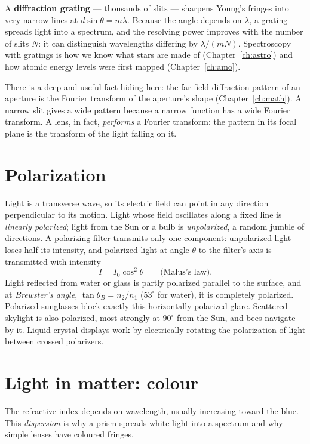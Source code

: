 A \textbf{diffraction grating} --- thousands of slits --- sharpens Young's fringes into very narrow lines at $d\sin\theta = m\lambda$. Because the angle depends on $\lambda$, a grating spreads light into a spectrum, and the resolving power improves with the number of slits $N$: it can distinguish wavelengths differing by $\lambda/(mN)$. Spectroscopy with gratings is how we know what stars are made of (Chapter~\ref{ch:astro}) and how atomic energy levels were first mapped (Chapter~\ref{ch:amo}).

\begin{remark}
There is a deep and useful fact hiding here: the far-field diffraction pattern of an aperture is the Fourier transform of the aperture's shape (Chapter~\ref{ch:math}). A narrow slit gives a wide pattern because a narrow function has a wide Fourier transform. A lens, in fact, \emph{performs} a Fourier transform: the pattern in its focal plane is the transform of the light falling on it.
\end{remark}

\section{Polarization}

Light is a transverse wave, so its electric field can point in any direction perpendicular to its motion. Light whose field oscillates along a fixed line is \emph{linearly polarized}; light from the Sun or a bulb is \emph{unpolarized}, a random jumble of directions. A polarizing filter transmits only one component: unpolarized light loses half its intensity, and polarized light at angle $\theta$ to the filter's axis is transmitted with intensity
\[
  I = I_0\cos^2\theta \qquad\text{(Malus's law)}.
\]
Light reflected from water or glass is partly polarized parallel to the surface, and at \emph{Brewster's angle}, $\tan\theta_B = n_2/n_1$ ($53^\circ$ for water), it is completely polarized. Polarized sunglasses block exactly this horizontally polarized glare. Scattered skylight is also polarized, most strongly at $90^\circ$ from the Sun, and bees navigate by it. Liquid-crystal displays work by electrically rotating the polarization of light between crossed polarizers.

\section{Light in matter: colour}

The refractive index depends on wavelength, usually increasing toward the blue. This \emph{dispersion} is why a prism spreads white light into a spectrum and why simple lenses have coloured fringes.

